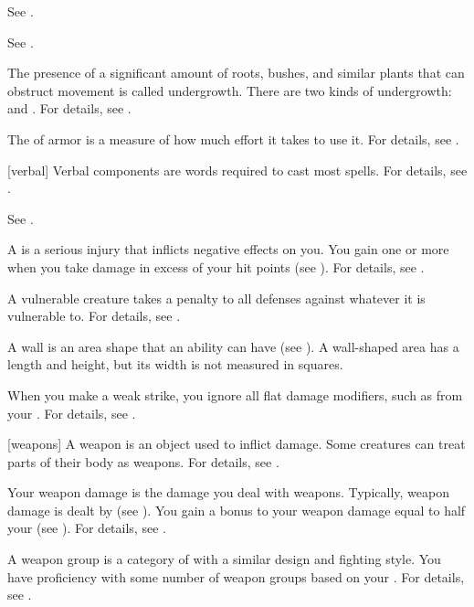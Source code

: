  See .

 See .

 The presence of a significant amount of roots, bushes, and similar plants that can obstruct movement is called undergrowth.
There are two kinds of undergrowth:  and .
For details, see .

 The  of armor is a measure of how much effort it takes to use it.
For details, see .

[verbal] Verbal components are words required to cast most spells.
For details, see .

 See .

 A  is a serious injury that inflicts negative effects on you.
You gain one or more  when you take damage in excess of your hit points (see ).
For details, see .

 A vulnerable creature takes a  penalty to all defenses against whatever it is vulnerable to.
For details, see .

 A wall is an area shape that an ability can have (see ).
A wall-shaped area has a length and height, but its width is not measured in squares.

 When you make a weak strike, you ignore all flat damage modifiers, such as from your .
For details, see .

[weapons] A weapon is an object used to inflict damage.
Some creatures can treat parts of their body as weapons.
For details, see .

 Your weapon damage is the damage you deal with weapons.
Typically, weapon damage is dealt by  (see ).
You gain a bonus to your weapon damage equal to half your  (see ).
For details, see .

 A weapon group is a category of  with a similar design and fighting style.
You have proficiency with some number of weapon groups based on your .
For details, see .

